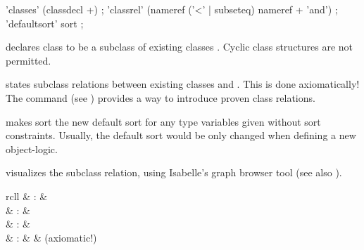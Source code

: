 \begin{isabellebody}
\begin{isamarkuptext}
  \begin{rail}
    'classes' (classdecl +)
    ;
    'classrel' (nameref ('<' | subseteq) nameref + 'and')
    ;
    'defaultsort' sort
    ;
  \end{rail}

  \begin{descr}

  \item [\mbox{\isa{\isacommand{classes}}}~\isa{c\ {\isasymsubseteq}\ c\isactrlsub {\isadigit{1}}{\isacharcomma}\ {\isasymdots}{\isacharcomma}\ c\isactrlsub n}]
  declares class  to be a subclass of existing classes .  Cyclic class structures are not permitted.

  \item [\mbox{\isa{\isacommand{classrel}}}~\isa{c\isactrlsub {\isadigit{1}}\ {\isasymsubseteq}\ c\isactrlsub {\isadigit{2}}}] states
  subclass relations between existing classes  and
  .  This is done axiomatically!  The \mbox{} command (see ) provides a way to
  introduce proven class relations.

  \item [\mbox{\isa{\isacommand{defaultsort}}}~\isa{s}] makes sort  the
  new default sort for any type variables given without sort
  constraints.  Usually, the default sort would be only changed when
  defining a new object-logic.

  \item [\mbox{\isa{\isacommand{class{\isacharunderscore}deps}}}] visualizes the subclass relation,
  using Isabelle's graph browser tool (see also \cite{isabelle-sys}).

  \end{descr}%
\end{isamarkuptext}%
\isamarkuptrue%
%
\isamarkuptrue%
%
\begin{isamarkuptext}%
\begin{matharray}{rcll}
    \mbox{} & : &  \\
    \mbox{} & : &  \\
    \mbox{} & : &  \\
    \mbox{} & : &  & (axiomatic!) \\
  \end{matharray}


\end{isamarkuptext}
\end{isabellebody}
